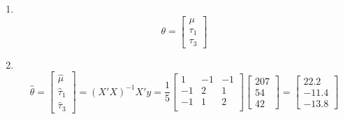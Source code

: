 \documentclass[11pt]{article}
\begin{document}
\begin{enumerate}
\begin{enumerate}
\item ~%
\vspace{-11pt}\begin{equation*}
\theta=\begin{bmatrix}
\mu\\ \tau_1\\ \tau_3
\end{bmatrix}
\end{equation*}

\item ~%
\vspace{-11pt}\begin{equation*}
\widehat\theta=\begin{bmatrix}
\widehat\mu\\ \widehat\tau_1\\ \widehat\tau_3
\end{bmatrix}=(X'X)^{-1}X'y=\frac{1}{5}\begin{bmatrix}
1&-1&-1\\
-1&2&1\\
-1&1&2\\
\end{bmatrix}\begin{bmatrix}
207\\54\\42
\end{bmatrix}
=\begin{bmatrix}
22.2\\-11.4\\-13.8
\end{bmatrix}
\end{equation*}


\end{enumerate}
\end{enumerate}
\end{document}
